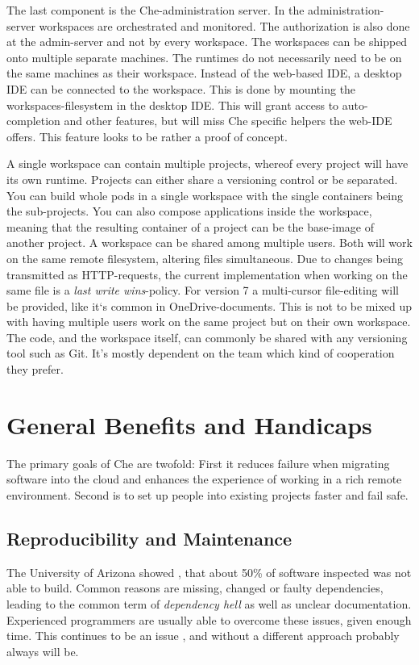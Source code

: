 \documentclass[english,utf8]{lni}
\begin{document}
The last component is the Che-administration server. 
In the administration-server workspaces are orchestrated and monitored. 
The authorization is also done at the admin-server and not by every workspace.
The workspaces can be shipped onto multiple separate machines.
The runtimes do not necessarily need to be on the same machines as their workspace. 
Instead of the web-based IDE, a desktop IDE can be connected to the workspace. 
This is done by mounting the workspaces-filesystem in the desktop  IDE. 
This  will grant access to auto-completion and other features, but will miss Che specific helpers the web-IDE offers.
This feature looks to be rather a proof of concept.

A single workspace can contain multiple projects, whereof every project will have its own runtime. 
Projects can either share a versioning control or be separated. 
You can build whole pods in a single workspace with the single containers being the sub-projects. 
You can also compose applications inside the workspace, meaning that the resulting 
container of a project can be the base-image of another project. 
A workspace can be shared among multiple users. 
Both will work on the same remote filesystem, altering files simultaneous. 
Due to changes being transmitted as HTTP-requests, the current implementation when working on the same file is a \textit{last write wins}-policy. 
For version 7 a multi-cursor file-editing will be provided, like it`s common in 
OneDrive-documents. 
This is not to be mixed up with having multiple users work on the same project but on their own workspace. 
The code, and the workspace itself, can commonly be shared with any versioning tool such as Git.
It's mostly dependent on the team which kind of cooperation they prefer. 

\section{General Benefits and Handicaps}
\label{sec:Eval}
The primary goals of Che are twofold: 
First it reduces failure when migrating software into the cloud and enhances the experience of working in a rich remote environment.
Second is to set up people into existing projects faster and fail safe.

\subsection{Reproducibility and Maintenance}
The University of Arizona showed \cite{CO16}, that about 50\% of software inspected was not able to build. 
Common reasons are missing, changed or faulty dependencies, leading to the common term of \textit{dependency hell} as well as unclear documentation. 
Experienced programmers are usually able to overcome these issues, given enough time. This continues to be an issue \cite{CL14}, and without a different approach probably always will be. 
\end{document}
